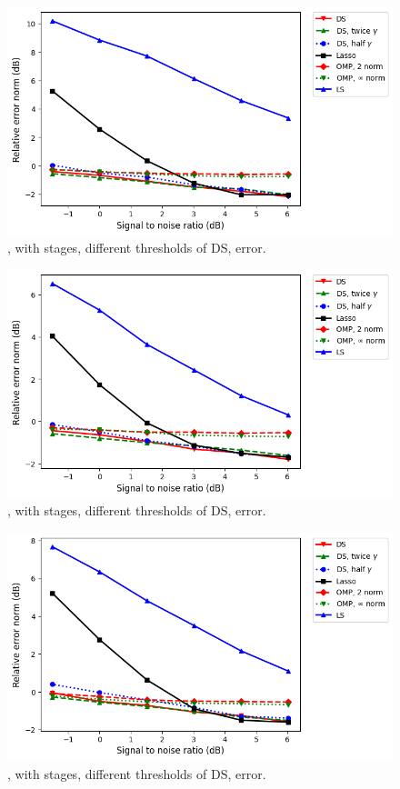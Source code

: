%
\begin {figure} [H]
\includegraphics [width = 0.8 \textwidth] {error-medium-more-square-six-ddss.png}
\caption {, with  stages, different thresholds of DS, error.}
\end {figure}
%
\begin {figure} [H]
\includegraphics [width = 0.8 \textwidth] {error-medium-more-wide-six-ddss.png}
\caption {, with  stages, different thresholds of DS, error.}
\end {figure}
%
\begin {figure} [H]
\includegraphics [width = 0.8 \textwidth] {error-medium-more-tall-six-ddss.png}
\caption {, with  stages, different thresholds of DS, error.}
\end {figure}

